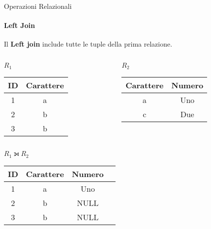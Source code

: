     \begin{frame}{Operazioni Relazionali}
        \framesubtitle{Left Join}
        Il \textbf{Left join} include tutte le tuple della prima relazione.
        \begin{columns}
            \begin{column}{0.48\textwidth}
                \centering
                {\small $R_1$}
                \newline
        \begin{tabular}{|c|c|}
            \hline
            \rowcolor{cyan!30}ID & Carattere \\
            \hline
            1 & a \\ \hline
            2 & \cellcolor{green}b \\ \hline
            3 & \cellcolor{green}b \\ \hline
            \end{tabular}
            \end{column}
            \begin{column}{0.48\textwidth}
                \centering
                {\small $R_2$}
                \newline
                \begin{tabular}{|c|c|}
                    \hline
                    \rowcolor{cyan!30} Carattere & Numero \\ \hline
                    a & Uno \\ \hline
                    \cellcolor{red}c & Due \\ \hline
                    \end{tabular}
            \end{column}
        \end{columns}
        \vspace{.5cm}
        \centering
        \pause
        {\small $R_1 \leftouterjoin R_2$}
        \begin{tabular}{|c|c|c|c|}
            \hline
            \rowcolor{cyan!30} ID & Carattere & Numero \\ \hline
            1 & a & Uno \\ \hline
            2 & b & NULL \\ \hline
            3 & b & NULL \\ \hline
            \end{tabular}
    \end{frame}
